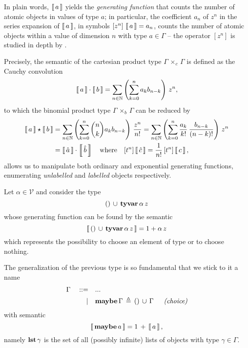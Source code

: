 In plain words, $\left\llbracket\,a\,\right\rrbracket$ yields  the \textit{generating function} that
counts the number of atomic objects in values of type $a$; in particular, the
coefficient $a_{n}$ of $z^{n}$ in the series expansion of $\left\llbracket\,a\,\right\rrbracket$, in
symbols $[z^{n}]\,\left\llbracket\,a\,\right\rrbracket = a_{n}$, counts the number of atomic objects
within a value of dimension $n$ with type $a\in\Gamma$ -- the operator
$[z^{n}]$ is studied in depth by \citet{MSV07}.

Precisely, the semantic of the cartesian product type
$\Gamma\,\times_{c}\,\Gamma$ is defined as the Cauchy convolution
\begin{displaymath}
    \left\llbracket\,a\,\right\rrbracket\cdot\left\llbracket\,b\,\right\rrbracket = \sum_{n\in\mathbb{N}}{\left(\sum_{k=0}^{n}{a_{k}b_{n-k}}\right)\,z^{n}},
\end{displaymath}
to which the binomial product type $\Gamma\,\times_{b}\,\Gamma$ can be reduced by
\begin{displaymath}
\begin{split}
    \left\llbracket\,a\,\right\rrbracket\star\left\llbracket\,b\,\right\rrbracket   
        &= \sum_{n\in\mathbb{N}}{\left(\sum_{k=0}^{n}{{ {n}\choose{k} }a_{k}b_{n-k}}\right)\,\frac{z^{n}}{n!}} 
         = \sum_{n\in\mathbb{N}}{\left(\sum_{k=0}^{n}{\frac{a_{k}}{k!}\,\frac{b_{n-k}}{(n-k)!}}\right)\,z^{n}} \\
        &= \left\llbracket\,\hat{a}\,\right\rrbracket\cdot\left\llbracket\,\hat{b}\,\right\rrbracket \quad\text{where}\quad[t^{n}]\left\llbracket\,\hat{c}\,\right\rrbracket = \frac{1}{n!}\,[t^{n}]\left\llbracket\,c\,\right\rrbracket,
\end{split}
\end{displaymath}
allows us to manipulate both ordinary and exponential generating functions,
enumerating \textit{unlabelled} and \textit{labelled} objects respectively.

\begin{example}
Let $\alpha\in\mathcal{V}$ and consider the type
\begin{displaymath}
    ()\,\cup\,\textbf{tyvar}\,\alpha\,z 
\end{displaymath}
whose generating function can be found by the semantic
\begin{displaymath}
    \left\llbracket\,()\,\cup\,\textbf{tyvar}\,\alpha\,z\,\right\rrbracket = 1 + \alpha\,z
\end{displaymath}
which represents the possibility to choose an element of type \tyvar{\alpha} or
to choose nothing.
\end{example}

\begin{definition}[\maybe{\gamma}]
The generalization of the previous type is so fundamental that we stick to it a name
\begin{displaymath}
\begin{split}
    \Gamma\quad::=\quad&... \\
           |\quad&\maybe{\Gamma}\,\triangleq\,\tydu{\tyunit}{\Gamma}\indent\textit{(choice)}
\end{split}
\end{displaymath}
with semantic
\begin{displaymath}
    \left\llbracket\,\textbf{maybe}\,a\,\right\rrbracket = 1\,+\,\left\llbracket\,a\,\right\rrbracket,
\end{displaymath}
namely $\textbf{lst}\,\gamma$ is the set of all (possibly infinite) lists of
objects with type $\gamma\in\Gamma$.
\end{definition}

